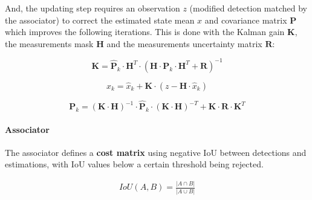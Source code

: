 {
    And, the updating step requires an observation $z$ (modified detection matched by the associator) 
    to correct the estimated state mean $x$ and covariance matrix $\mathbf{P}$ which improves the following iterations. 
    This is done with the Kalman gain $\mathbf{K}$, the measurements mask $\mathbf{H}$ and the measurements uncertainty matrix $\mathbf{R}$:
}

\begin{equation}
    \label{eqn:Kalman gain}
    \mathbf{K} = \hat{\mathbf{P}}_{k} \cdot \mathbf{H}^{T} \cdot (\mathbf{H} \cdot \mathbf{P}_{k} \cdot \mathbf{H}^{T} + \mathbf{R})^{-1}
\end{equation}

\begin{equation}
    \label{eqn:Kalman state mean correction}
    x_{k} = \hat{x}_{k} + \mathbf{K} \cdot (z - \mathbf{H} \cdot \hat{x}_{k})
\end{equation}

\begin{equation}
    \label{eqn:Kalman covariance matrix correction}
    \mathbf{P}_{k} = (\mathbf{K} \cdot \mathbf{H})^{-1} \cdot \hat{\mathbf{P}}_{k} \cdot (\mathbf{K} \cdot \mathbf{H})^{-T} + \mathbf{K} \cdot \mathbf{R} \cdot \mathbf{K}^{T}
\end{equation}

\needspace{0.1\textheight}

\paragraph{Associator}

{
    The associator defines a \textbf{cost matrix} using negative \ac{IoU} between detections and estimations, with \ac{IoU} values below a certain threshold being rejected.
}

\begin{equation}
    \label{eqn:IoU}
    \begin{gathered}
        IoU(A, B) = \frac{|A \cap B|}{|A \cup B|} \\[0.25cm]
    \end{gathered}
\end{equation}

